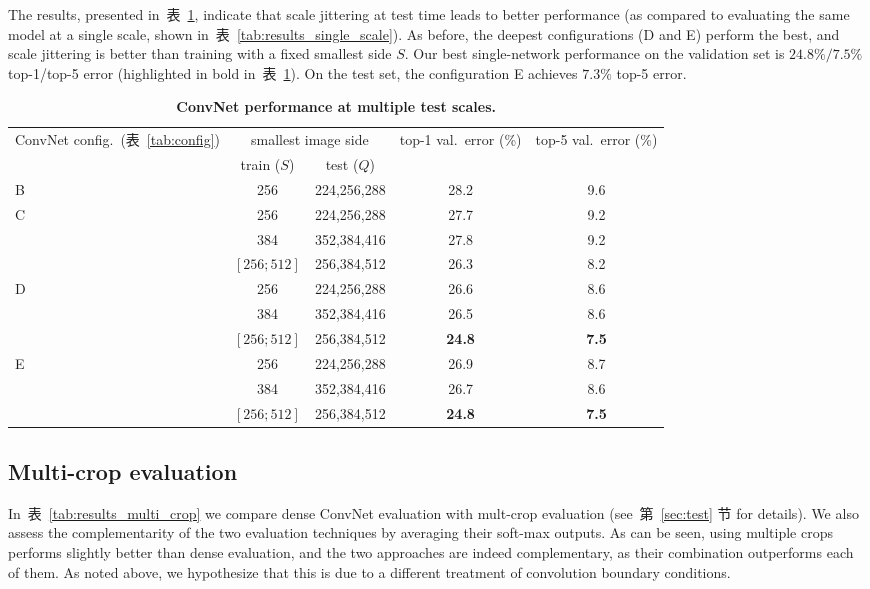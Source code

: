 \documentclass{article} %
\newcommand{\tblref}[1]{表~\ref{#1}}
\newcommand{\sref}[1]{第~\ref{#1} 节}
\begin{document}
The results, presented in~\tblref{tab:results_multi_scale}, indicate that scale jittering at test time leads to better performance (as compared to evaluating 
the same model at a single scale, shown in~\tblref{tab:results_single_scale}). 
As before, the deepest configurations (D and E) perform the best, and scale jittering is better than training with a fixed smallest side $S$.
Our best single-network performance on the validation set is $24.8\%/7.5\%$ top-1/top-5 error (highlighted in bold in~\tblref{tab:results_multi_scale}).
On the test set, the configuration E achieves $7.3\%$ top-5 error.

\vspace{-1em}

\begin{table}[htb]
\small
\centering
\caption{\textbf{ConvNet performance at multiple test scales.}
}
\begin{tabular}{|l|c|c|c|c|} \hline
ConvNet config.\ (\tblref{tab:config}) & \multicolumn{2}{c|}{smallest image side} & top-1 val.\ error (\%) & top-5 val.\ error (\%) \\ \cline{2-3}
& train ($S$) & test ($Q$) & & \\ \hline
B & 256 & 224,256,288 & 28.2 & 9.6  \\ \hline
\multirow{3}{*}{C} & 256 & 224,256,288 & 27.7 & 9.2  \\ \cline{2-5}
 & 384 & 352,384,416 & 27.8 & 9.2  \\ \cline{2-5}
 & $\left[256;512\right]$ & 256,384,512 & 26.3 & 8.2  \\ \hline 
\multirow{3}{*}{D} & 256 & 224,256,288 & 26.6  & 8.6  \\ \cline{2-5}
 & 384 & 352,384,416 & 26.5  & 8.6  \\ \cline{2-5}
 & $\left[256;512\right]$ & 256,384,512 & \textbf{24.8}  & \textbf{7.5}  \\ \hline 
\multirow{3}{*}{E} & 256 & 224,256,288 & 26.9  & 8.7  \\ \cline{2-5}
 & 384 & 352,384,416 & 26.7  & 8.6  \\ \cline{2-5}
 & $\left[256;512\right]$ & 256,384,512 & \textbf{24.8}  & \textbf{7.5}  \\ \hline 
\end{tabular}
\label{tab:results_multi_scale}
\end{table}

\subsection{Multi-crop evaluation}
\label{sec:multi-crop}
In~\tblref{tab:results_multi_crop} we compare dense ConvNet evaluation with mult-crop evaluation (see~\sref{sec:test} for details). We also assess the complementarity of the two evaluation techniques by averaging their soft-max outputs. As can be seen, using multiple crops performs slightly better than dense evaluation, and the two approaches are indeed complementary, as their combination outperforms each of them. As noted above, we hypothesize that this is due to a different treatment of convolution boundary conditions.
\end{document}
